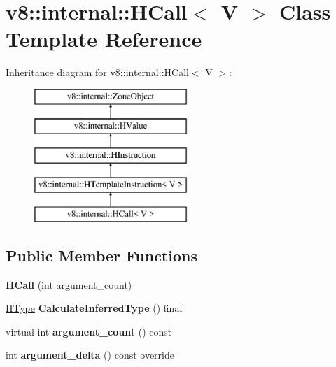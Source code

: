\hypertarget{classv8_1_1internal_1_1_h_call}{}\section{v8\+:\+:internal\+:\+:H\+Call$<$ V $>$ Class Template Reference}
\label{classv8_1_1internal_1_1_h_call}
Inheritance diagram for v8\+:\+:internal\+:\+:H\+Call$<$ V $>$\+:\begin{figure}[H]
\begin{center}
\leavevmode
\includegraphics[height=5.000000cm]{classv8_1_1internal_1_1_h_call}
\end{center}
\end{figure}
\subsection*{Public Member Functions}
\begin{DoxyCompactItemize}
\item 
{\bfseries H\+Call} (int argument\+\_\+count)\hypertarget{classv8_1_1internal_1_1_h_call_a7b635fa53717780c7a44b2a71b5b5cb0}{}\label{classv8_1_1internal_1_1_h_call_a7b635fa53717780c7a44b2a71b5b5cb0}

\item 
\hyperlink{classv8_1_1internal_1_1_h_type}{H\+Type} {\bfseries Calculate\+Inferred\+Type} () final\hypertarget{classv8_1_1internal_1_1_h_call_ad25a5e297c2dd674cf4d714e6b793760}{}\label{classv8_1_1internal_1_1_h_call_ad25a5e297c2dd674cf4d714e6b793760}

\item 
virtual int {\bfseries argument\+\_\+count} () const \hypertarget{classv8_1_1internal_1_1_h_call_ab0ce30c1b02fc12cbf77cbe4b03f6ffb}{}\label{classv8_1_1internal_1_1_h_call_ab0ce30c1b02fc12cbf77cbe4b03f6ffb}

\item 
int {\bfseries argument\+\_\+delta} () const  override\hypertarget{classv8_1_1internal_1_1_h_call_a0ddc53d2e3cd624c21d31dad85a06ede}{}\label{classv8_1_1internal_1_1_h_call_a0ddc53d2e3cd624c21d31dad85a06ede}

\end{DoxyCompactItemize}
